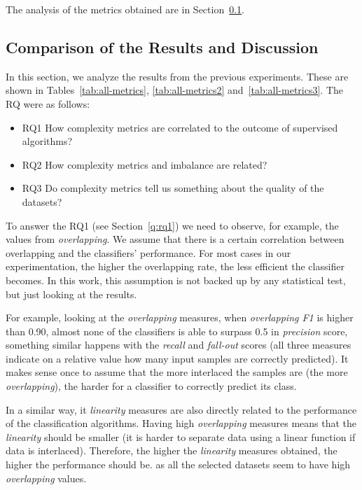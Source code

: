 The analysis of the metrics obtained are in Section~\ref{sec:compresults}.

\subsection{Comparison of the Results and Discussion}\label{sec:compresults}

In this section, we analyze the results from the previous experiments. These are 
shown in Tables~\ref{tab:all-metrics}, \ref{tab:all-metrics2} 
and~\ref{tab:all-metrics3}. The RQ were as follows:

\begin{itemize}
    \item RQ1 How complexity metrics are correlated to the outcome of 
	supervised algorithms?\label{q:rq1}
    \item RQ2 How complexity metrics and imbalance are related?\label{q:rq2}
    \item RQ3 Do complexity metrics tell us something about the quality of the 
	datasets?\label{q:rq3}
\end{itemize}

To answer the RQ1 (see Section~\ref{q:rq1}) we need to observe, for example, the 
values from \textit{overlapping}. We assume that there is a certain correlation 
between overlapping and the classifiers' performance. For most cases in our 
experimentation, the higher the overlapping rate, the less efficient the 
classifier becomes. In this work, this assumption is not backed up by any 
statistical test, but just looking at the results.

For example, looking at the \textit{overlapping} measures, when 
\textit{overlapping F1} is higher than 0.90, almost none of the classifiers is 
able to surpass 0.5 in \textit{precision} score, something similar happens with 
the \textit{recall} and \textit{fall-out} scores (all three measures indicate on 
a relative value how many input samples are correctly predicted). It makes sense 
once to assume that the more interlaced the samples are (the more 
\textit{overlapping}), the harder for a classifier to correctly predict its 
class. 

In a similar way, it \textit{linearity} measures are also directly related to 
the performance of the classification algorithms. Having high 
\textit{overlapping} measures means that the \textit{linearity} should be 
smaller (it is harder to separate data using a linear function if data is 
interlaced). Therefore, the higher the \textit{linearity} measures obtained, the 
higher the performance should be. %
as all the selected datasets seem to have high \textit{overlapping} values.

